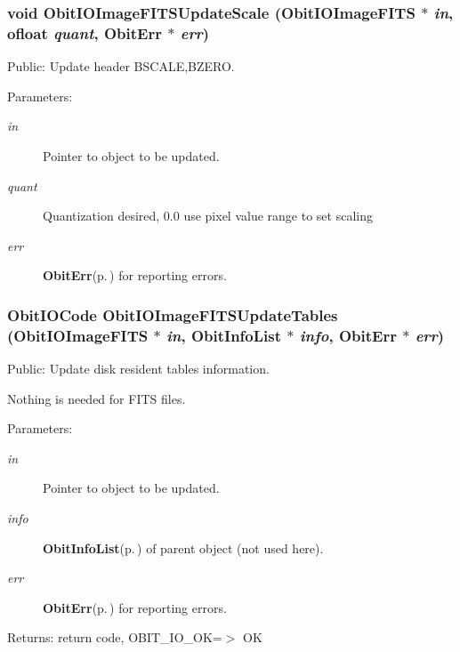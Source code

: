 \subsubsection{\setlength{\rightskip}{0pt plus 5cm}void Obit\-IOImage\-FITSUpdate\-Scale ({\bf Obit\-IOImage\-FITS} $\ast$ {\em in}, {\bf ofloat} {\em quant}, {\bf Obit\-Err} $\ast$ {\em err})}\label{ObitIOImageFITS_8c_a36}


Public: Update header BSCALE,BZERO. 

\begin{Desc}
\item[Parameters:]
\begin{description}
\item[{\em in}]Pointer to object to be updated. \item[{\em quant}]Quantization desired, 0.0 use pixel value range to set scaling \item[{\em err}]{\bf Obit\-Err}{\rm (p.\,\pageref{structObitErr})} for reporting errors. \end{description}
\end{Desc}
\subsubsection{\setlength{\rightskip}{0pt plus 5cm}Obit\-IOCode Obit\-IOImage\-FITSUpdate\-Tables ({\bf Obit\-IOImage\-FITS} $\ast$ {\em in}, {\bf Obit\-Info\-List} $\ast$ {\em info}, {\bf Obit\-Err} $\ast$ {\em err})}\label{ObitIOImageFITS_8c_a35}


Public: Update disk resident tables information. 

Nothing is needed for FITS files. \begin{Desc}
\item[Parameters:]
\begin{description}
\item[{\em in}]Pointer to object to be updated. \item[{\em info}]{\bf Obit\-Info\-List}{\rm (p.\,\pageref{structObitInfoList})} of parent object (not used here). \item[{\em err}]{\bf Obit\-Err}{\rm (p.\,\pageref{structObitErr})} for reporting errors. \end{description}
\end{Desc}
\begin{Desc}
\item[Returns:]return code, OBIT\_\-IO\_\-OK=$>$ OK \end{Desc}
